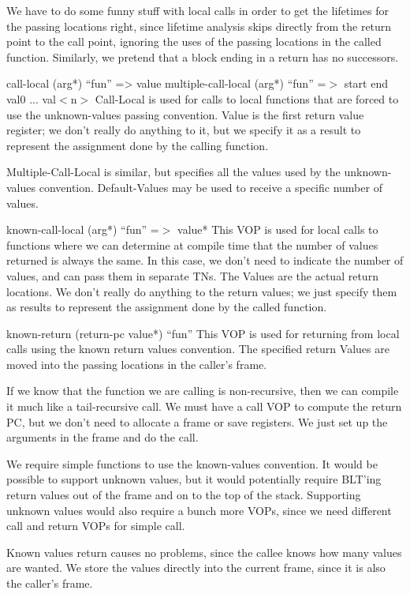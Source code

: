 {\begin{itemize, spread 0, spacing 1}
We have to do some funny stuff with local calls in order to get the lifetimes
for the passing locations right, since lifetime analysis skips directly from
the return point to the call point, ignoring the uses of the passing locations
in the called function.  Similarly, we pretend that a block ending in a return
has no successors.

call-local (arg*) ``fun'' => value
multiple-call-local (arg*) ``fun'' =$>$ start end val0 ... val$<$n$>$
    Call-Local is used for calls to local functions that are forced to use the
    unknown-values passing convention.  Value is the first return value
    register; we don't really do anything to it, but we specify it as a result
    to represent the assignment done by the calling function.

    Multiple-Call-Local is similar, but specifies all the values used by the
    unknown-values convention.  Default-Values may be used to receive a
    specific number of values.

known-call-local (arg*) ``fun'' =$>$ value*
    This VOP is used for local calls to functions where we can determine at
    compile time that the number of values returned is always the same.  In
    this case, we don't need to indicate the number of values, and can pass
    them in separate TNs.  The Values are the actual return locations.  We
    don't really do anything to the return values; we just specify them as
    results to represent the assignment done by the called function.

known-return (return-pc value*) ``fun''
    This VOP is used for returning from local calls using the known return
    values convention.  The specified return Values are moved into the passing
    locations in the caller's frame.


If we know that the function we are calling is non-recursive, then we can
compile it much like a tail-recursive call.  We must have a call VOP to compute
the return PC, but we don't need to allocate a frame or save registers.  We
just set up the arguments in the frame and do the call.

We require simple functions to use the known-values convention.  It would be
possible to support unknown values, but it would potentially require BLT'ing
return values out of the frame and on to the top of the stack.  Supporting
unknown values would also require a bunch more VOPs, since we need different
call and return VOPs for simple call.

Known values return causes no problems, since the callee knows how many values
are wanted.  We store the values directly into the current frame, since it is
also the caller's frame.


\end{itemize, spread 0, spacing 1}}
